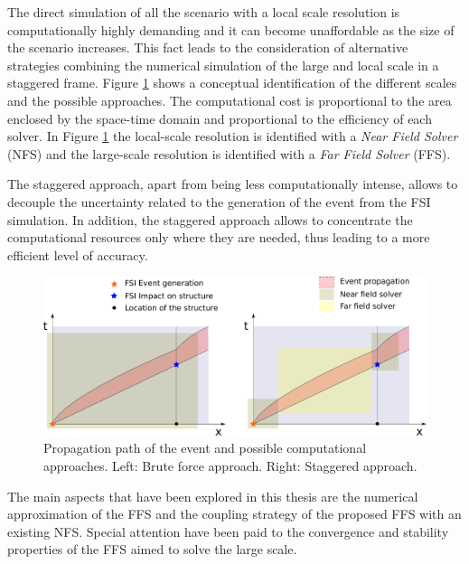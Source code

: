 The direct simulation of all the scenario with a local scale resolution is computationally highly demanding and it can become unaffordable as the size of the scenario increases. This fact leads to the consideration of alternative strategies combining the numerical simulation of the large and local scale in a staggered frame. Figure \ref{space_time_staggered_approach} shows a conceptual identification of the different scales and the possible approaches. The computational cost is proportional to the area enclosed by the space-time domain and proportional to the efficiency of each solver. In Figure \ref{space_time_staggered_approach} the local-scale resolution is identified with a \emph{Near Field Solver} (NFS) and the large-scale resolution is identified with a \emph{Far Field Solver} (FFS).

The staggered approach, apart from being less computationally intense, allows to decouple the uncertainty related to the generation of the event from the FSI simulation. In addition, the staggered approach allows to concentrate the computational resources only where they are needed, thus leading to a more efficient level of accuracy.


\begin{figure}
    \centering
    \includegraphics[width=\textwidth]{img/coupling/space_time}
    \caption{Propagation path of the event and possible computational approaches. Left: Brute force approach. Right: Staggered approach.}
    \label{space_time_staggered_approach}
\end{figure}


The main aspects that have been explored in this thesis are the numerical approximation of the FFS and the coupling strategy of the proposed FFS with an existing NFS. Special attention have been paid to the convergence and stability properties of the FFS aimed to solve the large scale.





